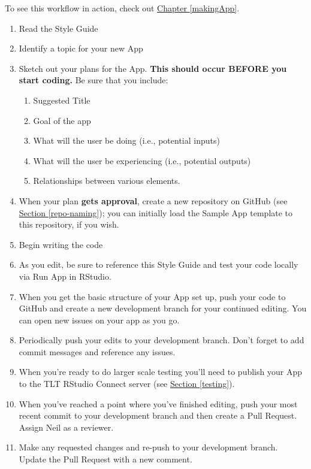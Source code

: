 \documentclass[
]{book}
\providecommand{\tightlist}{%
  \setlength{\itemsep}{0pt}\setlength{\parskip}{0pt}}
\begin{document}
To see this workflow in action, check out \protect\hyperlink{makingApp}{Chapter \ref{makingApp}}.

\begin{enumerate}
\def\labelenumi{\arabic{enumi}.}
\tightlist
\item
  Read the Style Guide
\item
  Identify a topic for your new App
\item
  Sketch out your plans for the App. \textbf{This should occur BEFORE you start coding.} Be sure that you include:

  \begin{enumerate}
  \def\labelenumii{\alph{enumii}.}
  \tightlist
  \item
    Suggested Title
  \item
    Goal of the app
  \item
    What will the user be doing (i.e., potential inputs)
  \item
    What will the user be experiencing (i.e., potential outputs)
  \item
    Relationships between various elements.
  \end{enumerate}
\item
  When your plan \textbf{gets approval}, create a new repository on GitHub (see \protect\hyperlink{repo-naming}{Section \ref{repo-naming}}); you can initially load the Sample App template to this repository, if you wish.
\item
  Begin writing the code
\item
  As you edit, be sure to reference this Style Guide and test your code locally via Run App in RStudio.
\item
  When you get the basic structure of your App set up, push your code to GitHub and create a new development branch for your continued editing. You can open new issues on your app as you go.
\item
  Periodically push your edits to your development branch. Don't forget to add commit messages and reference any issues.
\item
  When you're ready to do larger scale testing you'll need to publish your App to the TLT RStudio Connect server (see \protect\hyperlink{testing}{Section \ref{testing}}).
\item
  When you've reached a point where you've finished editing, push your most recent commit to your development branch and then create a Pull Request. Assign Neil as a reviewer.
\item
  Make any requested changes and re-push to your development branch. Update the Pull Request with a new comment.
\end{enumerate}
\end{document}
